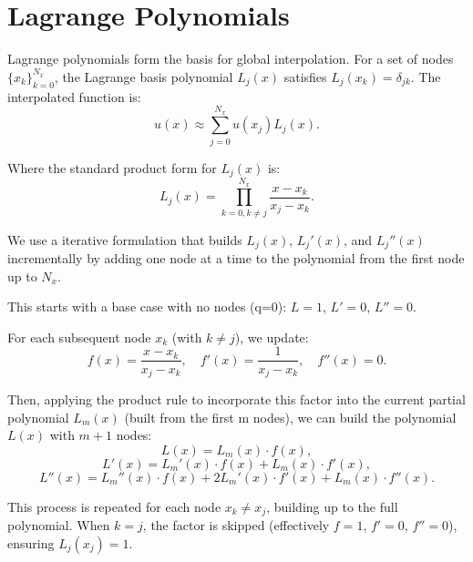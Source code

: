 \clearpage

\section{Lagrange Polynomials}

Lagrange polynomials form the basis for global interpolation. For a set of
nodes $\{x_k\}_{k=0}^{N_x}$, the Lagrange basis polynomial $L_j(x)$ satisfies
$L_j(x_k) = \delta_{jk}$. The interpolated function is:
\begin{equation}
    u(x) \approx \sum_{j=0}^{N_x} u(x_j) L_j(x).
\end{equation}

Where the standard product form for $L_j(x)$ is:
\begin{equation}
    L_j(x) = \prod_{k=0, k \neq j}^{N_x} \frac{x - x_k}{x_j - x_k}.
\end{equation}

We use a iterative formulation that builds $L_j(x)$, $L_j'(x)$, and $L_j''(x)$
incrementally by adding one node at a time to the polynomial from the first
node up to $N_x$.

This starts with a base case with no nodes (q=0): $L = 1$, $L' = 0$, $L'' = 0$.

For each subsequent node $x_k$ (with $k \neq j$), we update:
\begin{equation}
    f(x) = \frac{x - x_k}{x_j - x_k}, \quad f'(x) = \frac{1}{x_j - x_k}, \quad f''(x) = 0.
\end{equation}

Then, applying the product rule to incorporate this factor into the current
partial polynomial $L_m(x)$ (built from the first m nodes), we can build the
polynomial $L(x)$ with $m+1$ nodes:
\begin{equation}
    L(x) = L_m(x) \cdot f(x),
\end{equation}
\begin{equation}
    L'(x) = L_m'(x) \cdot f(x) + L_m(x) \cdot f'(x),
\end{equation}
\begin{equation}
    L''(x) = L_m''(x) \cdot f(x) + 2 L_m'(x) \cdot f'(x) + L_m(x) \cdot f''(x).
\end{equation}

This process is repeated for each node $x_k \neq x_j$, building up to the full
polynomial. When $k = j$, the factor is skipped (effectively $f=1$, $f'=0$,
$f''=0$), ensuring $L_j(x_j) = 1$.

